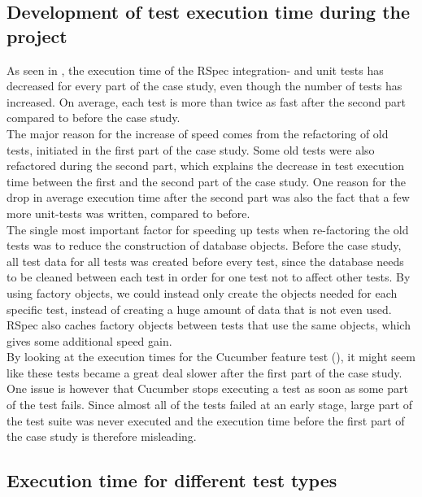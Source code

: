 
\subsection{Development of test execution time during the project}

As seen in , the execution time of the RSpec
integration- and unit tests has decreased for every part of the case
study, even though the number of tests has increased. On average, each
test is more than twice as fast after the second part compared to before
the case study.\\

The major reason for the increase of speed comes from the refactoring of
old tests, initiated in the first part of the case study. Some old tests
were also refactored during the second part, which explains the decrease
in test execution time between the first and the second part of the case
study. One reason for the drop in average execution time after the
second part was also the fact that a few more unit-tests was written,
compared to before.\\

The single most important factor for speeding up tests when re-factoring
the old tests was to reduce the construction of database objects. Before
the case study, all test data for all tests was created before every
test, since the database needs to be cleaned between each test in order
for one test not to affect other tests. By using factory objects, we
could instead only create the objects needed for each specific test,
instead of creating a huge amount of data that is not even used. RSpec
also caches factory objects between tests that use the same objects,
which gives some additional speed gain.\\

By looking at the execution times for the Cucumber feature test
(), it might seem like these tests became a
great deal slower after the first part of the case study. One issue is
however that Cucumber stops executing a test as soon as some part of the
test fails. Since almost all of the tests failed at an early stage,
large part of the test suite was never executed and the execution time
before the first part of the case study is therefore misleading.\\


\subsection{Execution time for different test types}

